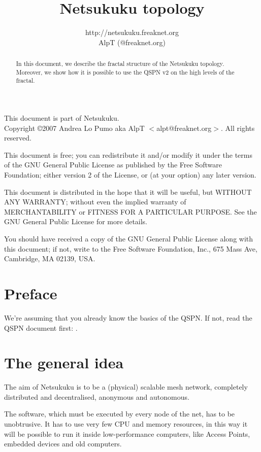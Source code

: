 \documentclass[a4paper]{article}
\title{Netsukuku topology}
\author{http://netsukuku.freaknet.org\\AlpT (@freaknet.org)}
\begin{document}
\maketitle
\begin{abstract}
	In this document, we describe the fractal structure of the Netsukuku
	topology. Moreover, we show how it is possible to use the QSPN v2 on
	the high levels of the fractal.
\end{abstract}
\pagebreak
\begin{small}
  This document is part of Netsukuku.\\
  Copyright \copyright 2007 Andrea Lo Pumo aka AlpT $<$alpt@freaknet.org$>$.
  All rights reserved.

  This document is free; you can redistribute it and/or modify it
  under the terms of the GNU General Public License as published by
  the Free Software Foundation; either version 2 of the License, or
  (at your option) any later version.

  This document is distributed in the hope that it will be useful, but
  WITHOUT ANY WARRANTY; without even the implied warranty of
  MERCHANTABILITY or FITNESS FOR A PARTICULAR PURPOSE\@.  See the GNU
  General Public License for more details.

  You should have received a copy of the GNU General Public License
  along with this document; if not, write to the Free Software
  Foundation, Inc., 675 Mass Ave, Cambridge, MA 02139, USA.
\end{small}

\clearpage
\tableofcontents
\clearpage
{}


\section{Preface}
\label{sec:preface}

We're assuming that you already know the basics of the QSPN. If not, read the
QSPN document first: \cite{qspndoc}.

\section{The general idea}
\label{sec:general_idea}

The aim of Netsukuku is to be a (physical) scalable mesh network, completely
distributed and decentralised, anonymous and autonomous.

The software, which must be executed by every node of the net, has to be
unobtrusive. It has to use very few CPU and memory resources, in this way it
will be possible to run it inside low-performance computers, like Access Points,
embedded devices and old computers.
\end{document}
